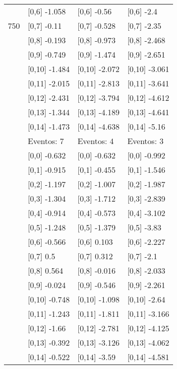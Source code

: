 \begin{table}
\begin{tabular}[t]{llll}
 & {}[0,6] -1.058 & {}[0,6] -0.56 & {}[0,6] -2.4\\
750 & {}[0,7] -0.11 & {}[0,7] -0.528 & {}[0,7] -2.35\\
\addlinespace
 & {}[0,8] -0.193 & {}[0,8] -0.973 & {}[0,8] -2.468\\
 & {}[0,9] -0.749 & {}[0,9] -1.474 & {}[0,9] -2.651\\
 & {}[0,10] -1.484 & {}[0,10] -2.072 & {}[0,10] -3.061\\
 & {}[0,11] -2.015 & {}[0,11] -2.813 & {}[0,11] -3.641\\
 & {}[0,12] -2.431 & {}[0,12] -3.794 & {}[0,12] -4.612\\
\addlinespace
 & {}[0,13] -1.344 & {}[0,13] -4.189 & {}[0,13] -4.641\\
 & {}[0,14] -1.473 & {}[0,14] -4.638 & {}[0,14] -5.16\\
 & Eventos:  7 & Eventos:  4 & Eventos:  3\\
 & {}[0,0] -0.632 & {}[0,0] -0.632 & {}[0,0] -0.992\\
 & {}[0,1] -0.915 & {}[0,1] -0.455 & {}[0,1] -1.546\\
\addlinespace
 & {}[0,2] -1.197 & {}[0,2] -1.007 & {}[0,2] -1.987\\
 & {}[0,3] -1.304 & {}[0,3] -1.712 & {}[0,3] -2.839\\
 & {}[0,4] -0.914 & {}[0,4] -0.573 & {}[0,4] -3.102\\
 & {}[0,5] -1.248 & {}[0,5] -1.379 & {}[0,5] -3.83\\
 & {}[0,6] -0.566 & {}[0,6] 0.103 & {}[0,6] -2.227\\
\addlinespace
1000 & {}[0,7] 0.5 & {}[0,7] 0.312 & {}[0,7] -2.1\\
 & {}[0,8] 0.564 & {}[0,8] -0.016 & {}[0,8] -2.033\\
 & {}[0,9] -0.024 & {}[0,9] -0.546 & {}[0,9] -2.261\\
 & {}[0,10] -0.748 & {}[0,10] -1.098 & {}[0,10] -2.64\\
 & {}[0,11] -1.243 & {}[0,11] -1.811 & {}[0,11] -3.166\\
\addlinespace
 & {}[0,12] -1.66 & {}[0,12] -2.781 & {}[0,12] -4.125\\
 & {}[0,13] -0.392 & {}[0,13] -3.126 & {}[0,13] -4.062\\
 & {}[0,14] -0.522 & {}[0,14] -3.59 & {}[0,14] -4.581\\
\bottomrule
\end{tabular}
\end{table}
